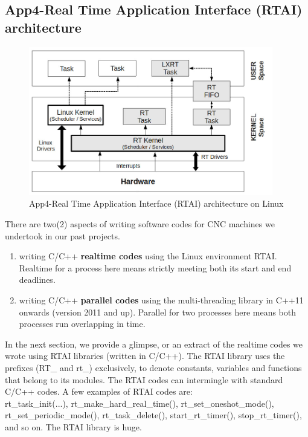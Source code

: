 \subsection{App4-Real Time Application Interface (RTAI) architecture}

\begin{figure}[htbp]
	\begin{center}
		\includegraphics[width=0.95\textwidth]{./07-images/img-Ch4App/rtai-architecture-on-linux.jpg}
		\caption{App4-Real Time Application Interface (RTAI) architecture on Linux}
		\label{fig:App4-rtai-architecture-on-linux.jpg}
	\end{center}
\end{figure}

There are two(2) aspects of writing software codes for CNC machines we undertook in our past projects. 
\begin{enumerate}
	\item writing C/C++ \textbf{realtime codes} using the Linux environment RTAI. Realtime for a process here means strictly meeting both its start and end deadlines. 
	
	\item writing C/C++ \textbf{parallel codes} using the multi-threading library in C++11 onwards (version 2011 and up). Parallel for two processes here means both processes run overlapping in time.
\end{enumerate}

In the next section, we provide a glimpse, or an extract of the realtime codes we wrote using RTAI libraries (written in C/C++). The RTAI library uses the prefixes (RT\_ and rt\_) exclusively, to denote constants, variables and functions that belong to its modules. The RTAI codes can intermingle with standard C/C++ codes. A few examples of RTAI codes are:\\
rt\_task\_init(...), rt\_make\_hard\_real\_time(), rt\_set\_oneshot\_mode(), rt\_set\_periodic\_mode(), rt\_task\_delete(), start\_rt\_timer(), stop\_rt\_timer(), and so on. The RTAI library is huge.
\vspace*{1\baselineskip}

